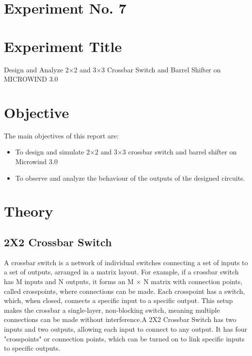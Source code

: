 \documentclass[a4paper,12pt]{article}
\begin{document}
	\section{Experiment No. 7}
	
	
	\section{Experiment Title }
	Design and Analyze 2×2 and 3×3 Crossbar Switch and Barrel Shifter on MICROWIND 3.0
	\section{Objective}
	The main objectives of this report are:
	\begin{itemize}
		\item To design and simulate 2×2 and 3×3 crossbar switch and barrel shifter on Microwind 3.0
		\item To observe and analyze the behaviour of the outputs of the designed circuits.
	
	\end{itemize}
	
	\section{Theory}
	\subsection{2X2 Crossbar Switch}
	A crossbar switch is a network of individual switches connecting a set of inputs to a set of outputs, arranged in a matrix layout. For example, if a crossbar switch has M inputs and N outputs, it forms an M × N matrix with connection points, called crosspoints, where connections can be made. Each crosspoint has a switch, which, when closed, connects a specific input to a specific output. This setup makes the crossbar a single-layer, non-blocking switch, meaning multiple connections can be made without interference.A 2X2 Crossbar Switch has two inputs and two outputs, allowing each input to connect to any output. It has four "crosspoints" or connection points, which can be turned on to link specific inputs to specific outputs.
\end{document}
